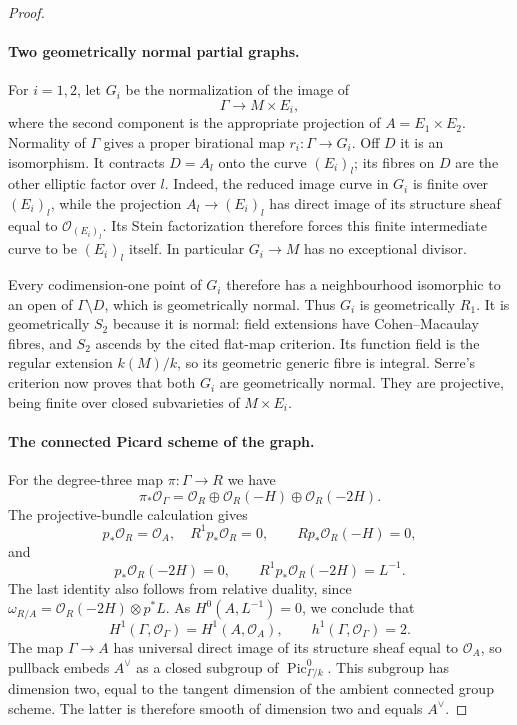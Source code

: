 \begin{proof}
\paragraph{Two geometrically normal partial graphs.}
For $i=1,2$, let $G_i$ be the normalization of the image of
\[
       \Gamma\longrightarrow M\times E_i,
\]
where the second component is the appropriate projection of
$A=E_1\times E_2$.  Normality of $\Gamma$ gives a proper
birational map $r_i:\Gamma\to G_i$.  Off $D$ it is an
isomorphism.  It contracts $D=A_l$ onto the curve $(E_i)_l$;
its fibres on $D$ are the other elliptic factor over $l$.
Indeed, the reduced image curve in $G_i$ is finite over
$(E_i)_l$, while the projection $A_l\to(E_i)_l$ has direct
image of its structure sheaf equal to $\mathcal O_{(E_i)_l}$.
Its Stein factorization therefore forces this finite
intermediate curve to be $(E_i)_l$ itself.
In particular $G_i\to M$ has no
exceptional divisor.

Every codimension-one point of $G_i$ therefore has a
neighbourhood isomorphic to an open of $\Gamma\setminus D$,
which is geometrically normal.  Thus $G_i$ is geometrically
$R_1$.  It is geometrically $S_2$ because it is normal:
field extensions have Cohen--Macaulay fibres, and $S_2$
ascends by the cited flat-map criterion.  Its function field
is the regular extension $k(M)/k$, so its geometric generic
fibre is integral.  Serre's criterion now proves that both
$G_i$ are geometrically normal.  They are projective, being
finite over closed subvarieties of $M\times E_i$.

\paragraph{The connected Picard scheme of the graph.}
For the degree-three map $\pi:\Gamma\to R$ we have
\[
 \pi_*\mathcal O_\Gamma
 =\mathcal O_R\oplus\mathcal O_R(-H)\oplus\mathcal O_R(-2H).
\]
The projective-bundle calculation gives
\[
 p_*\mathcal O_R=\mathcal O_A,\quad R^1p_*\mathcal O_R=0,
 \qquad Rp_*\mathcal O_R(-H)=0,
\]
and
\[
 p_*\mathcal O_R(-2H)=0,\qquad
 R^1p_*\mathcal O_R(-2H)=L^{-1}.
\]
The last identity also follows from relative duality, since
$\omega_{R/A}=\mathcal O_R(-2H)\otimes p^*L$.
As $H^0(A,L^{-1})=0$, we conclude that
\[
 H^1(\Gamma,\mathcal O_\Gamma)=H^1(A,\mathcal O_A),
 \qquad h^1(\Gamma,\mathcal O_\Gamma)=2.
\]
The map $\Gamma\to A$ has universal direct image of its
structure sheaf equal to $\mathcal O_A$, so pullback embeds
$A^\vee$ as a closed subgroup of $\operatorname{Pic}^0_{\Gamma/k}$.
This subgroup has dimension two, equal to the tangent dimension
of the ambient connected group scheme.  The latter is therefore
smooth of dimension two and equals $A^\vee$.


\end{proof}
